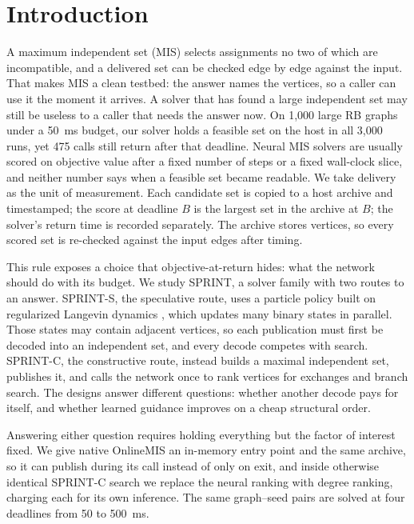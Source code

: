 \section{Introduction}

A maximum independent set (MIS) selects assignments no two of which are incompatible, and a delivered set can be checked edge by edge against the input. That makes MIS a clean testbed: the answer names the vertices, so a caller can use it the moment it arrives. A solver that has found a large independent set may still be useless to a caller that needs the answer now. On 1,000 large RB graphs under a 50~ms budget, our solver holds a feasible set on the host in all 3,000 runs, yet 475 calls still return after that deadline. Neural MIS solvers are usually scored on objective value after a fixed number of steps or a fixed wall-clock slice, and neither number says when a feasible set became readable. We take delivery as the unit of measurement. Each candidate set is copied to a host archive and timestamped; the score at deadline \(B\) is the largest set in the archive at \(B\); the solver's return time is recorded separately. The archive stores vertices, so every scored set is re-checked against the input edges after timing.

This rule exposes a choice that objective-at-return hides: what the network should do with its budget. We study SPRINT, a solver family with two routes to an answer. SPRINT-S, the speculative route, uses a particle policy built on regularized Langevin dynamics \citep{feng2025regularized}, which updates many binary states in parallel. Those states may contain adjacent vertices, so each publication must first be decoded into an independent set, and every decode competes with search. SPRINT-C, the constructive route, instead builds a maximal independent set, publishes it, and calls the network once to rank vertices for exchanges and branch search. The designs answer different questions: whether another decode pays for itself, and whether learned guidance improves on a cheap structural order.

Answering either question requires holding everything but the factor of interest fixed. We give native OnlineMIS an in-memory entry point and the same archive, so it can publish during its call instead of only on exit, and inside otherwise identical SPRINT-C search we replace the neural ranking with degree ranking, charging each for its own inference. The same graph--seed pairs are solved at four deadlines from 50 to 500~ms.

